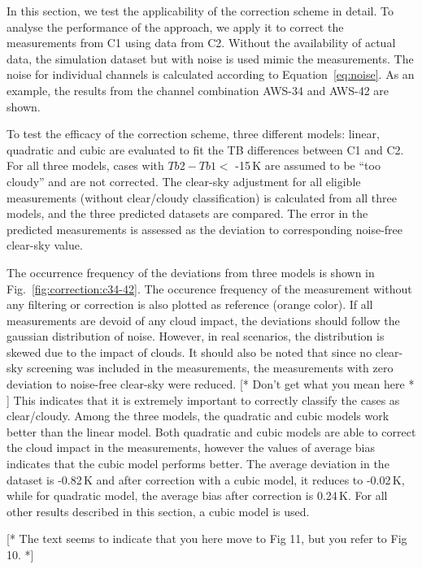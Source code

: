 \documentclass[12pt]{article}
\begin{document}
%
In this section, we test the applicability of the correction scheme in detail. To analyse the performance of the approach, we apply it to correct the measurements from C1 using data from C2. Without the availability of actual data, the simulation dataset but with noise is used mimic the measurements. The noise for individual channels is calculated according to Equation~\ref{eq:noise}. As an example, the results from the channel combination AWS-34 and AWS-42 are shown.

To test the efficacy of the correction scheme, three different models: linear,
quadratic and cubic are evaluated to fit the TB differences between C1 and C2.
For all three models, cases with $Tb2-Tb1 < $ -15\,K are assumed to be ``too
cloudy'' and are not corrected. The clear-sky adjustment for all eligible
measurements (without clear/cloudy classification) is calculated from all three
models, and the three predicted datasets are compared. The error in the
predicted measurements is assessed as the deviation to corresponding noise-free
clear-sky value.

The occurrence frequency of the deviations from three models is shown in
Fig.~\ref{fig:correction:c34-42}. The occurence frequency of the measurement
without any filtering or correction is also plotted as reference (orange
color). If all measurements are devoid of any cloud impact, the deviations
should follow the gaussian distribution of noise. However, in real scenarios,
the distribution is skewed due to the impact of clouds. It should also be noted
that since no clear-sky screening was included in the measurements, the
measurements with zero deviation to noise-free clear-sky were reduced. [* Don't
get what you mean here * ] This
indicates that it is extremely important to correctly classify the cases as
clear/cloudy. Among the three models, the quadratic and cubic models work
better than the linear model. Both quadratic and cubic models are able to
correct the cloud impact in the measurements, however the values of average
bias indicates that the cubic model performs better. The average deviation in
the dataset is -0.82\,K and after correction with a cubic model, it reduces to
-0.02\,K, while for quadratic model, the average bias after correction is
0.24\,K. For all other results described in this section, a cubic model is
used.

[* The text seems to indicate that you here move to Fig 11, but you refer to
Fig 10. *]
\end{document}
